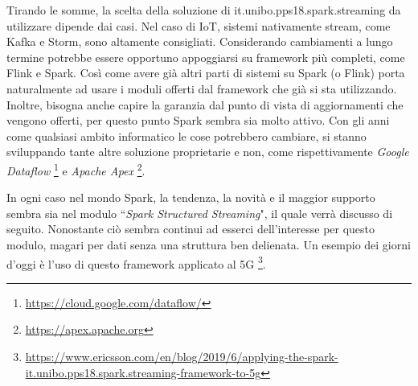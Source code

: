 \documentclass[12pt,italian]{article}
\begin{document}
Tirando le somme, la scelta della soluzione di it.unibo.pps18.spark.streaming da utilizzare dipende dai casi. Nel caso di IoT, sistemi nativamente stream, come Kafka e Storm, sono altamente consigliati. Considerando cambiamenti a lungo termine potrebbe essere opportuno appoggiarsi su framework più completi, come Flink e Spark. Così come avere già altri parti di sistemi su Spark (o Flink) porta naturalmente ad usare i moduli offerti dal framework che già si sta utilizzando.
Inoltre, bisogna anche capire la garanzia dal punto di vista di aggiornamenti che vengono offerti, per questo punto Spark sembra sia molto attivo.
Con gli anni come qualsiasi ambito informatico le cose potrebbero cambiare, si stanno sviluppando tante altre soluzione proprietarie e non, come rispettivamente \textit{Google Dataflow} \footnote{\url{https://cloud.google.com/dataflow/}} e \textit{Apache Apex} \footnote{\url{https://apex.apache.org}}.

\par In ogni caso nel mondo Spark, la tendenza, la novità e il maggior supporto sembra sia nel modulo ``\textit{Spark Structured Streaming}", il quale verrà discusso di seguito.
Nonostante ciò sembra continui ad esserci dell'interesse per questo modulo, magari per dati senza una struttura ben delienata. Un esempio dei giorni d'oggi è l'uso di questo framework applicato al 5G \footnote{\url{https://www.ericsson.com/en/blog/2019/6/applying-the-spark-it.unibo.pps18.spark.streaming-framework-to-5g}}.
\end{document}
